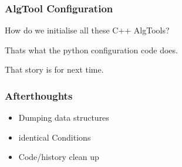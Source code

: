 \documentclass{beamer}
\begin{document}
 \frame
{
\frametitle{AlgTool Configuration}

How do we initialise all these C++ AlgTools?

Thats what the python configuration code does.

That story is for next time.
}

\frame
{
\frametitle{Afterthoughts}
\begin{itemize}
\item Dumping data structures
\item identical Conditions
\item Code/history clean up
\end{itemize}
}



 
\end{document}
